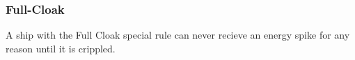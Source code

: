 \subsubsection{Full-Cloak}
A ship with the Full Cloak special rule can never recieve an energy spike for any reason until it is crippled.